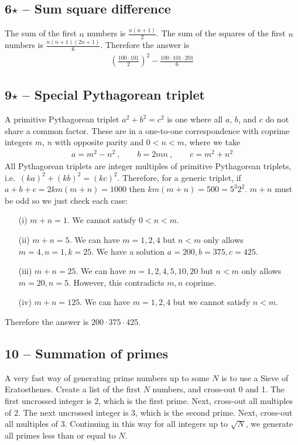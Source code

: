 \documentclass{article}
\begin{document}
\subsection*{6$\star$ -- Sum square difference} 
The sum of the first $n$ numbers is $\frac{n(n+1)}{2}$. 
The sum of the squares of the first $n$ numbers is $\frac{n(n+1)(2n+1)}{6}$. 
Therefore the answer is
\begin{align*}
	\boxed{ \left(\frac{100 \cdot 101}{2}\right)^2 -  \frac{100 \cdot 101 \cdot 201}{6} }
\end{align*}

\subsection*{9$\star$ -- Special Pythagorean triplet} 
A primitive Pythagorean triplet $a^2 + b^2 = c^2$ is one where all $a$, $b$, and $c$ do not share a common factor.
These are in a one-to-one correspondence with coprime integers $m$, $n$ with opposite parity and $0 < n < m$, where we take
\begin{align*}
	a = m^2 - n^2 ~, \qquad b = 2mn ~, \qquad c = m^2+n^2
\end{align*}
All Pythagorean triplets are integer multiples of primitive Pythagorean triplets, i.e.~$(ka)^2 + (kb)^2 = (kc)^2$.
Therefore, for a generic triplet, if $a+b+c = 2km(m+n) = 1000$ then $km(m+n) = 500 = 5^3 2^2$. 
$m+n$ must be odd so we just check each case:

\begin{itemize}
\item[(i)] $m+n = 1$. We cannot satisfy $0 < n < m$. 
\item[(ii)] $m+n = 5$. We can have $m = 1, 2, 4$ but $n < m$ only allows $m = 4, n = 1, k = 25$. We have a solution $a = 200, b = 375, c = 425$.
\item[(iii)] $m+n = 25$. We can have $m = 1, 2, 4, 5, 10, 20$ but $n < m$ only allows $m = 20, n = 5$. However, this contradicts $m,n$ coprime.
\item[(iv)] $m+n=125$. We can have $m = 1, 2, 4$ but we cannot satisfy $n < m$. 
\end{itemize}

Therefore the answer is $\boxed{ 200 \cdot 375 \cdot 425 }$.

\subsection*{10 -- Summation of primes} 
A very fast way of generating prime numbers up to some $N$ is to use a Sieve of Eratosthenes. 
Create a list of the first $N$ numbers, and cross-out 0 and 1.
The first uncrossed integer is 2, which is the first prime.
Next, cross-out all multiples of 2.
The next uncrossed integer is 3, which is the second prime.
Next, cross-out all multiples of 3.
Continuing in this way for all integers up to $\sqrt{N}$, we generate all primes less than or equal to $N$.
\end{document}

